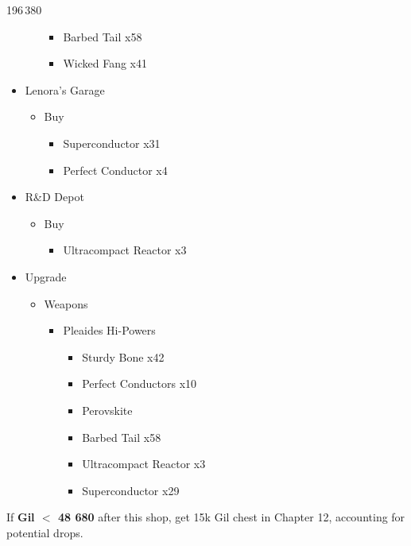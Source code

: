 \begin{shop}{196\,380}
\begin{itemize}
\begin{itemize}
\begin{itemize}
						\item Barbed Tail x58
						\item Wicked Fang x41
					\end{itemize}
			\end{itemize}
		\item Lenora's Garage
			\begin{itemize}
				\item Buy
					\begin{itemize}
						\item Superconductor x31
						\item Perfect Conductor x4
					\end{itemize}
			\end{itemize}
		\item R\&D Depot
			\begin{itemize}
				\item Buy
					\begin{itemize}
						\item Ultracompact Reactor x3
					\end{itemize}
			\end{itemize}									
	\end{itemize}
\end{shop}

\begin{upgrade}
	\begin{itemize}
		\item Upgrade
			\begin{itemize}
				\item Weapons
					\begin{itemize}
						\item Pleaides Hi-Powers
							\begin{itemize}
								\item Sturdy Bone x42
								\item Perfect Conductors x10
								\item Perovskite
								\item Barbed Tail x58
								\item Ultracompact Reactor x3
								\item Superconductor x29
							\end{itemize}
					\end{itemize}
			\end{itemize}
	\end{itemize}
\end{upgrade}

If \textbf{Gil $<$ 48 680} after this shop, get 15k Gil chest in Chapter 12, accounting for potential drops.

